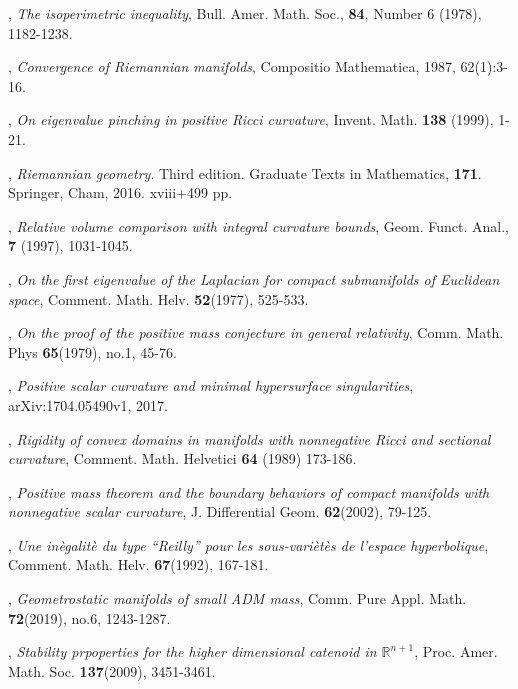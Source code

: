 \documentclass{amsart}
\numberwithin{equation}{section}
\theoremstyle{remark}
\renewcommand{\(}{\left(}
\renewcommand{\)}{\right)}
\renewcommand{\~}{\tilde}
\renewcommand{\-}{\overline}
\begin{document}
\begin{thebibliography}{10}
, {\em The isoperimetric inequality}, Bull. Amer. Math. Soc., {\bf 84}, Number 6 (1978), 1182-1238.

, {\em Convergence of Riemannian manifolds}, Compositio Mathematica, 1987, 62(1):3-16.

, {\em On eigenvalue pinching in positive Ricci curvature}, Invent. Math. {\bf 138} (1999), 1-21.

, {\em Riemannian geometry}. Third edition. Graduate Texts in Mathematics, {\bf 171}. Springer, Cham, 2016. xviii+499 pp.

, {\em Relative volume comparison with integral curvature bounds}, Geom. Funct. Anal., {\bf 7} (1997), 1031-1045.

, {\em On the first eigenvalue of the Laplacian for compact submanifolds of Euclidean space}, Comment. Math. Helv. {\bf 52}(1977), 525-533.

, {\em On the proof of the positive mass conjecture in general relativity}, Comm. Math. Phys {\bf 65}(1979), no.1, 45-76.

, {\em Positive scalar curvature and minimal hypersurface singularities}, arXiv:1704.05490v1, 2017.

, {\em Rigidity of convex domains in manifolds with nonnegative Ricci and sectional curvature}, Comment. Math. Helvetici {\bf 64} (1989) 173-186.

, {\em Positive mass theorem and the boundary behaviors of compact manifolds with nonnegative scalar curvature}, J. Differential Geom. {\bf 62}(2002), 79-125.

, {\em Une in\`egalit\`e du type ``Reilly'' pour les sous-vari\`et\`es de l'espace hyperbolique}, Comment. Math. Helv. {\bf 67}(1992), 167-181.

, {\em Geometrostatic manifolds of small ADM mass}, Comm. Pure Appl. Math. {\bf 72}(2019), no.6, 1243-1287.

, {\em Stability prpoperties for the higher dimensional catenoid in $\mathbb R^{n+1}$}, Proc. Amer. Math. Soc. {\bf 137}(2009), 3451-3461.


\end{thebibliography}
\end{document}
